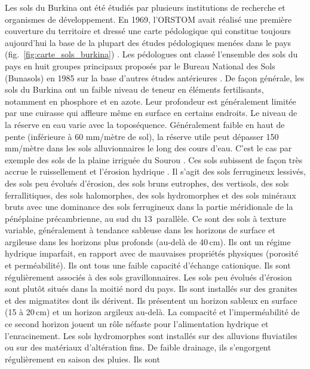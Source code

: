 \documentclass[a4paper,11pt]{article}
\begin{document}

Les sols du Burkina ont été étudiés par plusieurs institutions de
recherche et organismes de développement. En 1969, l'ORSTOM avait
réalisé une première couverture du territoire et dressé une carte
pédologique qui constitue toujours aujourd'hui la base de la plupart
des études pédologiques menées dans le pays
(fig.~\ref{fig:carte_sols_burkina}) \cite{BUNASOLS_1985}.  Les
pédologues ont classé l'ensemble des sols du pays en huit groupes
principaux proposés par le Bureau National des Sols (Bunasols) en 1985
sur la base d'autres études antérieures \cite{PERON_1975}. De façon
générale, les sols du Burkina ont un faible niveau de teneur en
éléments fertilisants, notamment en phosphore et en azote. Leur
profondeur est généralement limitée par une cuirasse qui affleure même
en surface en certains endroits. Le niveau de la réserve en eau varie
avec la toposéquence. Généralement faible en haut de pente (inférieure
à 60 mm/mètre de sol), la réserve utile peut dépasser 150 mm/mètre
dans les sols alluvionnaires le long des cours d'eau. C'est le cas par
exemple des sols de la plaine irriguée du Sourou
\cite{SOMENICOU_1983}. Ces sols subissent de façon très accrue le
ruissellement et l'érosion hydrique \cite{Roose_2004}. Il s'agit des
sols ferrugineux lessivés, des sols peu évolués d'érosion, des sols
bruns eutrophes, des vertisols, des sols ferrallitiques, des sols
halomorphes, des sols hydromorphes et des sols minéraux bruts avec une
dominance des sols ferrugineux dans la partie méridionale de la
pénéplaine précambrienne, au sud du 13\ieme\, parallèle. Ce sont des
sols à texture variable, généralement à tendance sableuse dans les
horizons de surface et argileuse dans les horizons plus profonds
(au-delà de 40\,cm). Ils ont un régime hydrique imparfait, en rapport
avec de mauvaises propriétés physiques (porosité et perméabilité). Ils
ont tous une faible capacité d'échange cationique. Ils sont
régulièrement associés à des sols gravillonnaires. Les sols peu
évolués d'érosion sont plutôt situés dans la moitié nord du pays. Ils
sont installés sur des granites et des migmatites dont ils
dérivent. Ils présentent un horizon sableux en surface (15 à 20\,cm)
et un horizon argileux au-delà. La compacité et l'imperméabilité de ce
second horizon jouent un rôle néfaste pour l'alimentation hydrique et
l'enracinement. Les sols hydromorphes sont installés sur des alluvions
fluviatiles ou sur des matériaux d'altération fins. De faible
drainage, ils s'engorgent régulièrement en saison des pluies. Ils sont
\end{document}

